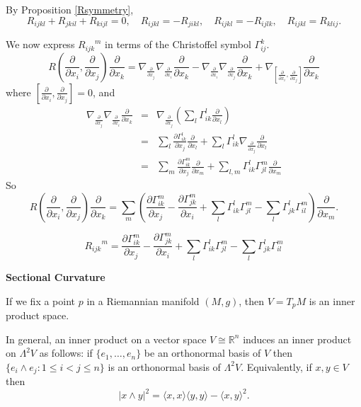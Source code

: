 \documentclass{amsart}
\numberwithin{equation}{section}
\newcommand{\bR}{\mathbb{R}}
\theoremstyle{definition}
\theoremstyle{theorem}
\begin{document}
By Proposition \ref{Rsymmetry}, 
$$
R_{ijkl}+ R_{jkil} + R_{kijl}=0,\quad
R_{ijkl}=-R_{jikl},\quad
R_{ijkl}= -R_{ijlk},\quad
R_{ijkl}=R_{klij}.
$$


We now express ${R_{ijk}}^m$ in terms of the Christoffel symbol $\Gamma_{ij}^k$. 
$$
R(\frac{\partial}{\partial x_i}, \frac{\partial}{\partial x_j})\frac{\partial}{\partial x_k}
=\nabla_{\frac{\partial}{\partial x_j}}\nabla_{\frac{\partial}{\partial x_i}}\frac{\partial}{\partial x_k}
-\nabla_{\frac{\partial}{\partial x_i}}\nabla_{\frac{\partial}{\partial x_j}}\frac{\partial}{\partial x_k}
+\nabla_{[\frac{\partial}{\partial x_i},\frac{\partial}{\partial x_j}] } \frac{\partial}{\partial x_k}
$$
where $[\frac{\partial}{\partial x_i},\frac{\partial}{\partial x_j} ]=0$, and
\begin{eqnarray*}
\nabla_{\frac{\partial}{\partial x_j}}\nabla_{\frac{\partial}{\partial x_i}}\frac{\partial}{\partial x_k} 
&=& \nabla_{\frac{\partial}{\partial x_j}}(\sum_l \Gamma_{ik}^l \frac{\partial}{\partial x_l}) \\
&=& \sum_l \frac{\partial \Gamma_{ik}^l}{\partial x_j} \frac{\partial}{\partial x_l}
+  \sum_l \Gamma_{ik}^l \nabla_{\frac{\partial}{\partial x_j}} \frac{\partial}{\partial x_l} \\
&=& \sum_m \frac{\partial \Gamma_{ik}^m}{\partial x_j} \frac{\partial}{\partial x_m}
+\sum_{l,m} \Gamma_{ik}^l \Gamma_{jl}^m \frac{\partial}{\partial x_m}
\end{eqnarray*}
So
$$
R(\frac{\partial}{\partial x_i}, \frac{\partial}{\partial x_j})\frac{\partial}{\partial x_k}
=\sum_m (\frac{\partial \Gamma_{ik}^m}{\partial x_j}- \frac{\partial \Gamma_{jk}^m}{\partial x_i}
+ \sum_l \Gamma_{ik}^l \Gamma_{jl}^m -\sum_l\Gamma_{jk}^l \Gamma_{il}^m ) \frac{\partial}{\partial x_m}.
$$

$$
\boxed{ {R_{ijk}}^m = \frac{\partial \Gamma_{ik}^m}{\partial x_j}- \frac{\partial \Gamma_{jk}^m}{\partial x_i}
+ \sum_l \Gamma_{ik}^l \Gamma_{jl}^m -\sum_l\Gamma_{jk}^l \Gamma_{il}^m }
$$
 
\noindent
{\bf \large Sectional Curvature}

If we fix a point $p$ in a Riemannian manifold $(M,g)$, then 
$V=T_p M$ is an inner product space. 

In general, an inner product on a vector space  $V\cong \bR^n$
induces an inner product on $\Lambda^2 V$ as follows: 
if $\{e_1,\ldots, e_n\}$ be an orthonormal basis of $V$
then $\{ e_i\wedge e_j: 1\leq i<j\leq n\}$ is an orthonormal basis of $\Lambda^2 V$.
Equivalently, if $x,y\in V$ then
$$
|x\wedge y|^2 =\langle x,x\rangle \langle y, y\rangle - \langle x,y\rangle^2. 
$$
\end{document}

